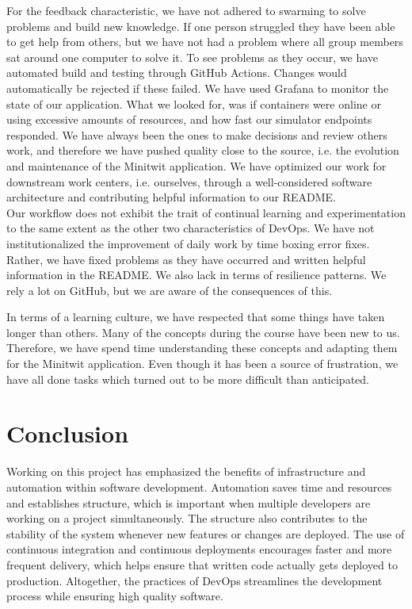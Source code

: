 \documentclass{article}
\begin{document}
For the feedback characteristic, we have not adhered to swarming to solve problems and build new knowledge. If one person struggled they have been able to get help from others, but we have not had a problem where all group members sat around one computer to solve it. To see problems as they occur, we have automated build and testing through GitHub Actions. Changes would automatically be rejected if these failed. We have used Grafana to monitor the state of our application. What we looked for, was if containers were online or using excessive amounts of resources, and how fast our simulator endpoints responded. We have always been the ones to make decisions and review others work, and therefore we have pushed quality close to the source, i.e. the evolution and maintenance of the Minitwit application. We have optimized our work for downstream work centers, i.e. ourselves, through a well-considered software architecture and contributing helpful information to our README.
\\
Our workflow does not exhibit the trait of continual learning and experimentation to the same extent as the other two characteristics of DevOps. We have not institutionalized the improvement of daily work by time boxing error fixes. Rather, we have fixed problems as they have occurred and written helpful information in the README. We also lack in terms of resilience patterns. We rely a lot on GitHub, but we are aware of the consequences of this. 

In terms of a learning culture, we have respected that some things have taken longer than others. Many of the concepts during the course have been new to us. Therefore, we have spend time understanding these concepts and adapting them for the Minitwit application. Even though it has been a source of frustration, we have all done tasks which turned out to be more difficult than anticipated.

\section{Conclusion}
Working on this project has emphasized the benefits of infrastructure and automation within software development. Automation saves time and resources and establishes structure, which is important when multiple developers are working on a project simultaneously. The structure also contributes to the stability of the system whenever new features or changes are deployed. The use of continuous integration and continuous deployments encourages faster and more frequent delivery, which helps ensure that written code actually gets deployed to production. Altogether, the practices of DevOps streamlines the development process while ensuring high quality software.
\end{document}
